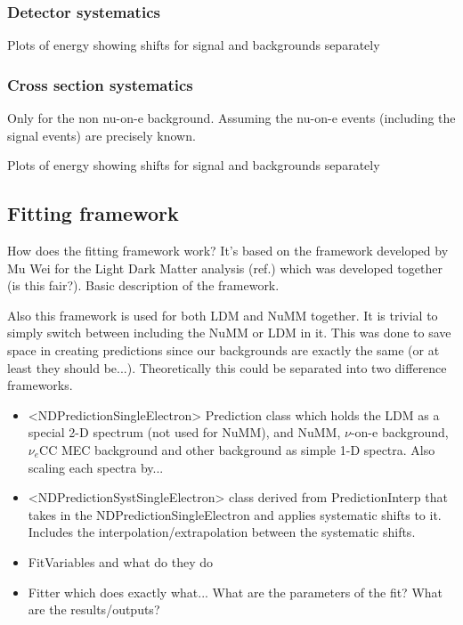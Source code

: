 \subsubsection*{Detector systematics}
Plots of energy showing shifts for signal and backgrounds separately

\subsubsection*{Cross section systematics}
Only for the non nu-on-e background. Assuming the nu-on-e events (including the signal events) are precisely known.

Plots of energy showing shifts for signal and backgrounds separately

\subsection{Fitting framework}
How does the fitting framework work? It's based on the framework developed by Mu Wei for the Light Dark Matter analysis (ref.) which was developed together (is this fair?). Basic description of the framework.

Also this framework is used for both LDM and NuMM together. It is trivial to simply switch between including the NuMM or LDM in it. This was done to save space in creating predictions since our backgrounds are exactly the same (or at least they should be...). Theoretically this could be separated into two difference frameworks.

\begin{itemize}
\item <NDPredictionSingleElectron> Prediction class which holds the LDM as a special 2-D spectrum (not used for NuMM), and NuMM, $\nu$-on-e background, $\nu_e$CC MEC background and other background as simple 1-D spectra. Also scaling each spectra by...
\item <NDPredictionSystSingleElectron> class derived from PredictionInterp that takes in the NDPredictionSingleElectron and applies systematic shifts to it. Includes the interpolation/extrapolation between the systematic shifts.
\item FitVariables and what do they do
\item Fitter which does exactly what... What are the parameters of the fit? What are the results/outputs?
\end{itemize}